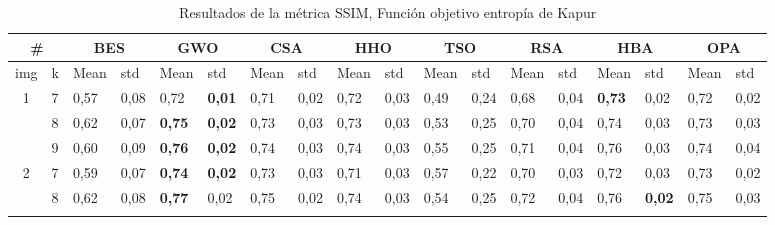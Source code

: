 \documentclass[conference]{IEEEtran}
\begin{document}
\begin{table}[]
	\caption{Resultados de la métrica SSIM, Función objetivo entropía de Kapur}
	\begin{tabular}{|cl|ll|ll|ll|ll|ll|ll|ll|ll|}
		\hline
		\multicolumn{2}{|c|}{\#} & \multicolumn{2}{c|}{BES} & \multicolumn{2}{c|}{GWO} & \multicolumn{2}{c|}{CSA} & \multicolumn{2}{c|}{HHO} & \multicolumn{2}{c|}{TSO} & \multicolumn{2}{c|}{RSA} & \multicolumn{2}{c|}{HBA} & \multicolumn{2}{c|}{OPA} \\ \hline
		\multicolumn{1}{|l|}{img} & k & \multicolumn{1}{l|}{Mean} & std & \multicolumn{1}{l|}{Mean} & std & \multicolumn{1}{l|}{Mean} & std & \multicolumn{1}{l|}{Mean} & std & \multicolumn{1}{l|}{Mean} & std & \multicolumn{1}{l|}{Mean} & std & \multicolumn{1}{l|}{Mean} & std & \multicolumn{1}{l|}{Mean} & std \\ \hline
		\multicolumn{1}{|c|}{\multirow{3}{*}{1}} & 7 & \multicolumn{1}{l|}{0,57} & 0,08 & \multicolumn{1}{l|}{0,72} & \textbf{0,01} & \multicolumn{1}{l|}{0,71} & 0,02 & \multicolumn{1}{l|}{0,72} & 0,03 & \multicolumn{1}{l|}{0,49} & 0,24 & \multicolumn{1}{l|}{0,68} & 0,04 & \multicolumn{1}{l|}{\textbf{0,73}} & 0,02 & \multicolumn{1}{l|}{0,72} & 0,02 \\ \cline{2-18} 
		\multicolumn{1}{|c|}{} & 8 & \multicolumn{1}{l|}{0,62} & 0,07 & \multicolumn{1}{l|}{\textbf{0,75}} & \textbf{0,02} & \multicolumn{1}{l|}{0,73} & 0,03 & \multicolumn{1}{l|}{0,73} & 0,03 & \multicolumn{1}{l|}{0,53} & 0,25 & \multicolumn{1}{l|}{0,70} & 0,04 & \multicolumn{1}{l|}{0,74} & 0,03 & \multicolumn{1}{l|}{0,73} & 0,03 \\ \cline{2-18} 
		\multicolumn{1}{|c|}{} & 9 & \multicolumn{1}{l|}{0,60} & 0,09 & \multicolumn{1}{l|}{\textbf{0,76}} & \textbf{0,02} & \multicolumn{1}{l|}{0,74} & 0,03 & \multicolumn{1}{l|}{0,74} & 0,03 & \multicolumn{1}{l|}{0,55} & 0,25 & \multicolumn{1}{l|}{0,71} & 0,04 & \multicolumn{1}{l|}{0,76} & 0,03 & \multicolumn{1}{l|}{0,74} & 0,04 \\ \hline
		\multicolumn{1}{|c|}{\multirow{3}{*}{2}} & 7 & \multicolumn{1}{l|}{0,59} & 0,07 & \multicolumn{1}{l|}{\textbf{0,74}} & \textbf{0,02} & \multicolumn{1}{l|}{0,73} & 0,03 & \multicolumn{1}{l|}{0,71} & 0,03 & \multicolumn{1}{l|}{0,57} & 0,22 & \multicolumn{1}{l|}{0,70} & 0,03 & \multicolumn{1}{l|}{0,72} & 0,03 & \multicolumn{1}{l|}{0,73} & 0,02 \\ \cline{2-18} 
		\multicolumn{1}{|c|}{} & 8 & \multicolumn{1}{l|}{0,62} & 0,08 & \multicolumn{1}{l|}{\textbf{0,77}} & 0,02 & \multicolumn{1}{l|}{0,75} & 0,02 & \multicolumn{1}{l|}{0,74} & 0,03 & \multicolumn{1}{l|}{0,54} & 0,25 & \multicolumn{1}{l|}{0,72} & 0,04 & \multicolumn{1}{l|}{0,76} & \textbf{0,02} & \multicolumn{1}{l|}{0,75} & 0,03 \\ \cline{2-18} 

\end{tabular}
\end{table}
\end{document}
